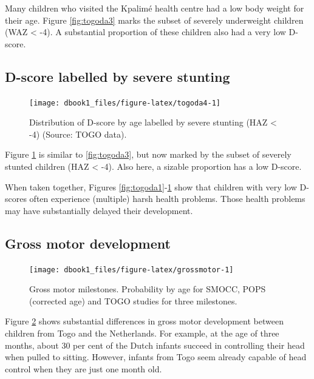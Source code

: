 \documentclass[
]{book}
\begin{document}
Many children who visited the Kpalimé health centre had a low body weight for their age. Figure \ref{fig:togoda3} marks the subset of severely underweight children (WAZ \textless{} -4). A substantial proportion of these children also had a very low D-score.

\hypertarget{d-score-labelled-by-severe-stunting}{%
\subsection{D-score labelled by severe stunting}\label{d-score-labelled-by-severe-stunting}}

\begin{figure}

{\centering \texttt{[image: dbook1\_files/figure-latex/togoda4-1]} 

}

\caption{Distribution of D-score by age labelled by severe stunting (HAZ \textless{} -4) (Source: TOGO data).}\label{fig:togoda4}
\end{figure}



Figure \ref{fig:togoda4} is similar to \ref{fig:togoda3}, but now marked by the subset of severely stunted children (HAZ \textless{} -4). Also here, a sizable proportion has a low D-score.

When taken together, Figures \ref{fig:togoda1}-\ref{fig:togoda4} show that children with very low D-scores often experience (multiple) harsh health problems. Those health problems may have substantially delayed their development.

\hypertarget{gross-motor-development}{%
\subsection{Gross motor development}\label{gross-motor-development}}

\begin{figure}

{\centering \texttt{[image: dbook1\_files/figure-latex/grossmotor-1]} 

}

\caption{Gross motor milestones. Probability by age for SMOCC, POPS (corrected age) and TOGO studies for three milestones.}\label{fig:grossmotor}
\end{figure}



Figure \ref{fig:grossmotor} shows substantial differences in gross motor development between children from Togo and the Netherlands. For example, at the age of three months, about 30 per cent of the Dutch infants succeed in controlling their head when pulled to sitting. However, infants from Togo seem already capable of head control when they are just one month old.
\end{document}
